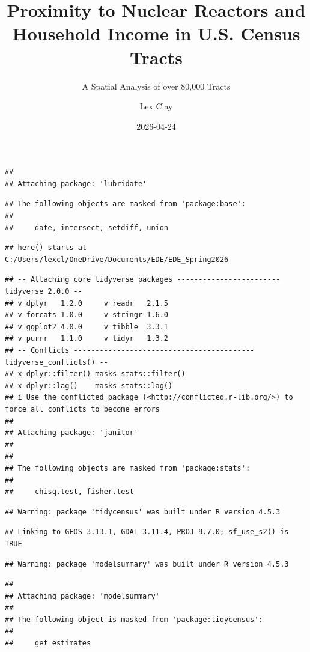\documentclass[
]{article}
\title{Proximity to Nuclear Reactors and Household Income in U.S. Census
Tracts}
\subtitle{A Spatial Analysis of over 80,000 Tracts}
\author{Lex Clay}
\date{2026-04-24}
\begin{document}
\maketitle

\begin{verbatim}
## 
## Attaching package: 'lubridate'
\end{verbatim}

\begin{verbatim}
## The following objects are masked from 'package:base':
## 
##     date, intersect, setdiff, union
\end{verbatim}

\begin{verbatim}
## here() starts at C:/Users/lexcl/OneDrive/Documents/EDE/EDE_Spring2026
\end{verbatim}

\begin{verbatim}
## -- Attaching core tidyverse packages ------------------------ tidyverse 2.0.0 --
## v dplyr   1.2.0     v readr   2.1.5
## v forcats 1.0.0     v stringr 1.6.0
## v ggplot2 4.0.0     v tibble  3.3.1
## v purrr   1.1.0     v tidyr   1.3.2
## -- Conflicts ------------------------------------------ tidyverse_conflicts() --
## x dplyr::filter() masks stats::filter()
## x dplyr::lag()    masks stats::lag()
## i Use the conflicted package (<http://conflicted.r-lib.org/>) to force all conflicts to become errors
## 
## Attaching package: 'janitor'
## 
## 
## The following objects are masked from 'package:stats':
## 
##     chisq.test, fisher.test
\end{verbatim}

\begin{verbatim}
## Warning: package 'tidycensus' was built under R version 4.5.3
\end{verbatim}

\begin{verbatim}
## Linking to GEOS 3.13.1, GDAL 3.11.4, PROJ 9.7.0; sf_use_s2() is TRUE
\end{verbatim}

\begin{verbatim}
## Warning: package 'modelsummary' was built under R version 4.5.3
\end{verbatim}

\begin{verbatim}
## 
## Attaching package: 'modelsummary'
## 
## The following object is masked from 'package:tidycensus':
## 
##     get_estimates
\end{verbatim}
\end{document}
